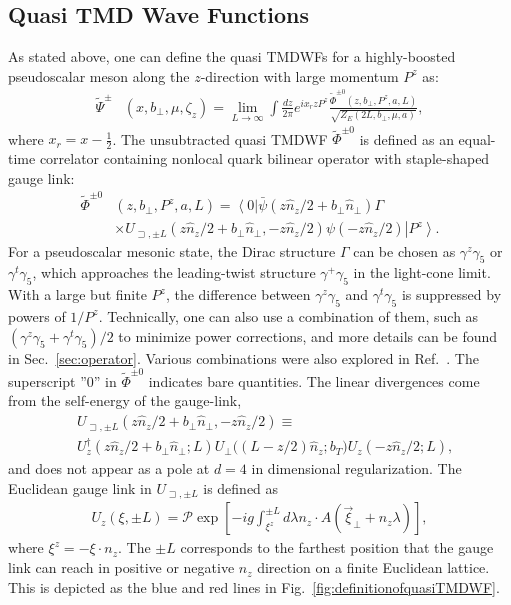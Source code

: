 

\subsection{Quasi TMD Wave Functions}
As stated above, one can define the quasi TMDWFs for a highly-boosted pseudoscalar meson along the $z$-direction with large momentum $P^z$ as: 
\begin{align}
	\tilde{\Psi}^{\pm}&\left(x,b_{\perp},\mu,\zeta_z\right)=\lim_{L\to\infty}\int\frac{dz}{2\pi}e^{ix_rzP^z}\frac{\tilde{\Phi}^{\pm0}\left(z,b_{\perp},P^z,a,L\right)}{\sqrt{Z_E(2L,b_{\perp},\mu, a)}},\label{eq:quasiWFinmomentumspace}
\end{align}
where $x_r=x-\frac{1}{2}$. The unsubtracted quasi TMDWF $\tilde{\Phi}^{\pm0}$ is defined as an equal-time correlator containing nonlocal quark bilinear operator with staple-shaped gauge link:
\begin{align}
	\tilde{\Phi}^{\pm0}&\left(z,b_{\perp},P^z,a,L\right) =\left\langle 0\right|\bar{\psi}\left(z \hat{n}_{z}/2+b_{\perp} \hat{n}_{\perp}\right) \Gamma \nonumber\\
	&\times U_{\sqsupset, \pm L}\left(z \hat{n}_{z}/2+b_{\perp} \hat{n}_{\perp},-z \hat{n}_{z}/2\right) \psi\left(-z \hat{n}_{z}/2\right)\left| P^{z}\right\rangle. \label{eq:quasiWFincoordinatespace}
\end{align}
For a pseudoscalar mesonic state, the Dirac structure $\Gamma$ can be chosen as $\gamma^z\gamma_5$ or $\gamma^t\gamma_5$, which approaches the leading-twist structure $\gamma^+\gamma_5$ in the light-cone limit. With a large but finite $P^z$, the difference between $\gamma^z\gamma_5$ and $\gamma^t\gamma_5$  is  suppressed by powers of $1/P^z$. Technically, one can also use a combination of them, such as $\left(\gamma^z\gamma_5+\gamma^t\gamma_5\right)/2$ to minimize  power corrections, and more details can be found  in Sec.~\ref{sec:operator}.  Various combinations were also explored in Ref.~\cite{Li:2021wvl}.  The superscript ''0'' in $\tilde{\Phi}^{\pm0}$ indicates bare quantities. The linear divergences come from the self-energy of the gauge-link, 
\begin{align}
	&U_{\sqsupset, \pm L}\left(z \hat{n}_{z}/2+b_{\perp} \hat{n}_{\perp},-z \hat{n}_{z}/2\right) \equiv\nonumber\\
	&	U_z^{\dagger}\left(z \hat{n}_{z}/2+b_{\perp} \hat{n}_{\perp}; L \right) U_{\perp}\big((L-z /2)\hat{n}_{z};{b}_T \big) U_z\left( -z \hat{n}_{z}/2; L \right), \label{eq:stapleshapedUlink}
\end{align}
and does not appear as a pole at $d=4$ in dimensional regularization. The Euclidean gauge link in $U_{\sqsupset, \pm L}$ is defined as
\begin{align}
	U_z(\xi,\pm L)=\mathcal{P}	\exp \left[-i g \int_{\xi^{z}}^{\pm L} d \lambda n_{z} \cdot A\left(\vec{\xi}_{\perp}+n_{z} \lambda\right)\right],
\end{align}
where $\xi^{z}=-\xi \cdot n_{z}$. The $\pm L$  corresponds to the farthest position that the gauge link can reach in positive or negative $n_z$ direction  on a finite Euclidean lattice. This is depicted as the blue and red lines in Fig.~\ref{fig:definitionofquasiTMDWF}.


